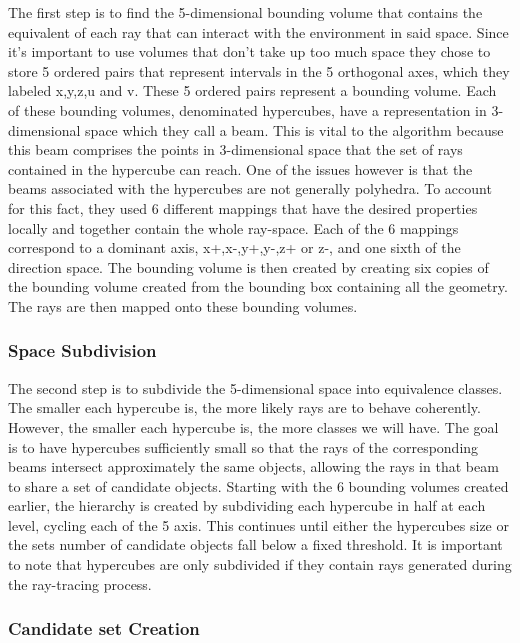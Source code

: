 The first step is to find the 5-dimensional bounding volume that contains the equivalent of each ray that can interact with the environment in said space. Since it's important to use volumes that don't take up too much space they chose to store 5 ordered pairs that represent intervals in the 5 orthogonal axes, which they labeled x,y,z,u and v. These 5 ordered pairs represent a bounding volume. Each of these bounding volumes, denominated hypercubes, have a representation in 3-dimensional space which they call a beam. This is vital to the algorithm because this beam comprises the points in 3-dimensional space that the set of rays contained in the hypercube can reach. One of the issues however is that the beams associated with the hypercubes are not generally polyhedra. To account for this fact, they used 6 different mappings that have the desired properties locally and together contain the whole ray-space. Each of the 6 mappings correspond to a dominant axis, x+,x-,y+,y-,z+ or z-, and one sixth of the direction space. The bounding volume is then created by creating six copies of the bounding volume created from the bounding box containing all the geometry. The rays are then mapped onto these bounding volumes.

\subsubsection{Space Subdivision}

The second step is to subdivide the 5-dimensional space into equivalence classes. The smaller each hypercube is, the more likely rays are to behave coherently. However, the smaller each hypercube is, the more classes we will have. The goal is to have hypercubes sufficiently small so that the rays of the corresponding beams intersect approximately the same objects, allowing the rays in that beam to share a set of candidate objects. Starting with the 6 bounding volumes created earlier, the hierarchy is created by subdividing each hypercube in half at each level, cycling each of the 5 axis. This continues until either the hypercubes size or the sets number of candidate objects fall below a fixed threshold. It is important to note that hypercubes are only subdivided if they contain rays generated during the ray-tracing process.

\subsubsection{Candidate set Creation}


